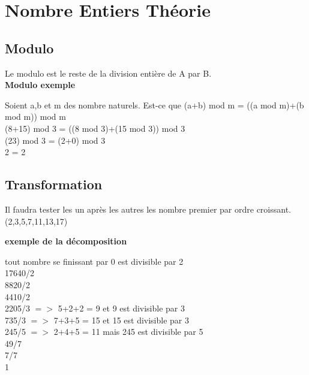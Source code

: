 \newpage

\chapter{Nombre Entiers Théorie}
\vspace{3mm} %
\section{Modulo}
\vspace{3mm} %

Le modulo est le reste de la division entière de A par B. \\

\vspace{3mm} %
\textbf{Modulo exemple}
\vspace{3mm} %

Soient a,b et m des nombre naturels. Est-ce que (a+b) mod m = ((a mod m)+(b mod m)) mod m \\

(8+15) mod 3 = ((8 mod 3)+(15 mod 3)) mod 3 \\
(23) mod 3 = (2+0) mod 3 \\
2 = 2

\vspace{3mm} %
\section{Transformation}
\vspace{3mm} %

Il faudra tester les un après les autres les nombre premier par ordre croissant. \\

(2,3,5,7,11,13,17)

\vspace{3mm} %
\textbf{exemple de la décomposition}
\vspace{3mm} %

tout nombre se finissant par 0 est divisible par 2 \\

17640/2 \\
8820/2  \\
4410/2  \\
2205/3 $=>$ 5+2+2 = 9 et 9 est divisible par 3 \\
735/3 $=>$ 7+3+5 = 15 et 15 est divisible par 3 \\
245/5 $=>$ 2+4+5 = 11 mais 245 est divisible par 5 \\
49/7 \\
7/7 \\
1

